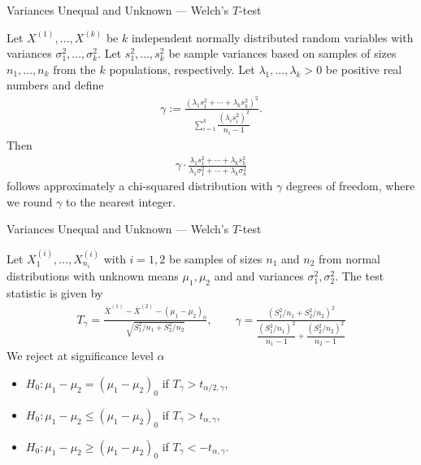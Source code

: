 \begin{frame}{Variances Unequal and Unknown --- Welch's $T$-test}

\justifying
{} Let $X^{(1)}, \ldots, X^{(k)}$ be $k$ independent normally distributed random variables with variances $\sigma_1^2, \ldots, \sigma_k^2$. Let $s_1^2, \ldots, s_k^2$ be sample variances based on samples of sizes $n_1, \ldots, n_k$ from the $k$ populations, respectively. Let $\lambda_1, \ldots, \lambda_k > 0$ be positive real numbers and define
\begin{align*}
\gamma := \frac{(\lambda_1 s_1^2 + \cdots + \lambda_k s_k^2)^2}{\displaystyle\sum_{i=1}^k \dfrac{(\lambda_i s_i^2)^2}{n_i-1} }.
\end{align*}
Then
\begin{align*}
\gamma \cdot \frac{\lambda_1 s_1^2 + \cdots + \lambda_k s_k^2}{\lambda_1 \sigma_1^2 + \cdots + \lambda_k \sigma_k^2}
\end{align*}
follows approximately a chi-squared distribution with $\gamma$ degrees of freedom, where we round $\gamma$  to the nearest integer.


\end{frame}


\begin{frame}{Variances Unequal and Unknown --- Welch's $T$-test}

\justifying
{} Let $X_1^{(i)}, \ldots, X_{n_i}^{(i)}$ with $i = 1, 2$ be samples of sizes $n_1$ and $n_2$ from normal distributions with unknown means $\mu_1, \mu_2$ and  and  variances $\sigma_1^2, \sigma_2^2$. The test statistic is given by
\begin{align*}
T_{\gamma} = \frac{\overline{X}^{(1)} - \overline{X}^{(2)} - (\mu_1-\mu_2)_0}{\sqrt{S_1^2/n_1 + S_2^2/n_2}}, \qquad \gamma = \frac{(S_1^2/n_1 + S_2^2/n_2)^2}{\dfrac{(S_1^2/n_1)^2}{n_1-1} + \dfrac{(S_2^2/n_2)^2}{n_2-1}}
\end{align*}
We reject at significance level $\alpha$
\begin{itemize}
	\item $H_0: \mu_1-\mu_2 = (\mu_1-\mu_2)_0$ if $T_{\gamma} > t_{\alpha/2,\gamma}$,
	\item $H_0: \mu_1-\mu_2 \leq (\mu_1-\mu_2)_0$ if $T_{\gamma} > t_{\alpha,\gamma}$,
	\item $H_0: \mu_1-\mu_2 \geq (\mu_1-\mu_2)_0$ if $T_{\gamma} < -t_{\alpha,\gamma}$.
\end{itemize}



\end{frame}


